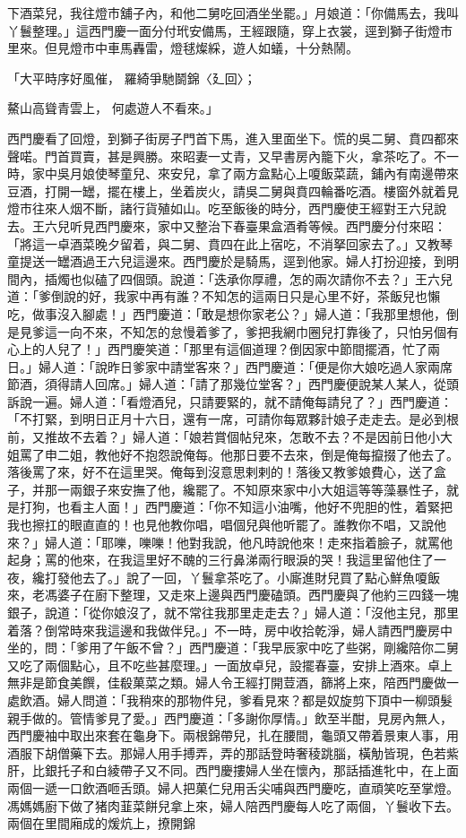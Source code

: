 \begin{showcontents}{}
下酒菜兒，我往燈巿舖子內，和他二舅吃回酒坐坐罷。」月娘道：「你備馬去，我叫丫鬟整理。」這西門慶一面分付玳安備馬，王經跟隨，穿上衣裳，逕到獅子街燈巿里來。但見燈巿中車馬轟雷，燈毬燦綵，遊人如蟻，十分熱鬧。

「大平時序好風催，  羅綺爭馳鬬錦〈廴回〉；

鰲山高聳青雲上，  何處遊人不看來。」

西門慶看了回燈，到獅子街房子門首下馬，進入里面坐下。慌的吳二舅、賁四都來聲喏。門首買賣，甚是興勝。來昭妻一丈青，又早書房內籠下火，拿茶吃了。不一時，家中吳月娘使琴童兒、來安兒，拿了兩方盒點心上嗄飯菜蔬，鋪內有南邊帶來豆酒，打開一罎，擺在樓上，坐着炭火，請吳二舅與賁四輪番吃酒。樓窗外就着見燈巿往來人烟不斷，諸行貨殖如山。吃至飯後的時分，西門慶使王經對王六兒說去。王六兒听見西門慶來，家中又整治下春臺果盒酒肴等候。西門慶分付來昭：「將這一卓酒菜晚夕留着，與二舅、賁四在此上宿吃，不消拏回家去了。」又教琴童提送一罎酒過王六兒這邊來。西門慶於是騎馬，逕到他家。婦人打扮迎接，到明間內，插燭也似磕了四個頭。說道：「迭承你厚禮，怎的兩次請你不去？」王六兒道：「爹倒說的好，我家中再有誰？不知怎的這兩日只是心里不好，茶飯兒也懶吃，做事沒入腳處！」西門慶道：「敢是想你家老公？」婦人道：「我那里想他，倒是見爹這一向不來，不知怎的怠慢着爹了，爹把我網巾圈兒打靠後了，只怕另個有心上的人兒了！」西門慶笑道：「那里有這個道理？倒因家中節間擺酒，忙了兩日。」婦人道：「說昨日爹家中請堂客來？」西門慶道：「便是你大娘吃過人家兩席節酒，須得請人回席。」婦人道：「請了那幾位堂客？」西門慶便說某人某人，從頭訴說一遍。婦人道：「看燈酒兒，只請要緊的，就不請俺每請兒了？」西門慶道：「不打緊，到明日正月十六日，還有一席，可請你每眾夥計娘子走走去。是必到根前，又推故不去着？」婦人道：「娘若賞個帖兒來，怎敢不去？不是因前日他小大姐罵了申二姐，教他好不抱怨說俺每。他那日要不去來，倒是俺每攛掇了他去了。落後罵了來，好不在這里哭。俺每到沒意思剌剌的！落後又教爹娘費心，送了盒子，并那一兩銀子來安撫了他，纔罷了。不知原來家中小大姐這等等藻暴性子，就是打狗，也看主人面！」西門慶道：「你不知這小油嘴，他好不兜胆的性，着緊把我也擦扛的眼直直的！也見他教你唱，唱個兒與他听罷了。誰教你不唱，又說他來？」婦人道：「耶嚛，嚛嚛！他對我說，他凡時說他來！走來指着臉子，就罵他起身；罵的他來，在我這里好不醜的三行鼻涕兩行眼淚的哭！我這里留他住了一夜，纔打發他去了。」說了一回，丫鬟拿茶吃了。小廝進財兒買了點心鮮魚嗄飯來，老馮婆子在廚下整理，又走來上邊與西門慶磕頭。西門慶與了他約三四錢一塊銀子，說道：「從你娘沒了，就不常往我那里走走去？」婦人道：「沒他主兒，那里着落？倒常時來我這邊和我做伴兒。」不一時，房中收拾乾淨，婦人請西門慶房中坐的，問：「爹用了午飯不曾？」西門慶道：「我早辰家中吃了些粥，剛纔陪你二舅又吃了兩個點心，且不吃些甚麼理。」一面放卓兒，設擺春臺，安排上酒來。卓上無非是節食美饌，佳殽菓菜之類。婦人令王經打開荳酒，篩將上來，陪西門慶做一處飲酒。婦人問道：「我稍來的那物件兒，爹看見來？都是奴旋剪下頂中一柳頭髮親手做的。管情爹見了愛。」西門慶道：「多謝你厚情。」飲至半酣，見房內無人，西門慶袖中取出來套在龜身下。兩根錦帶兒，扎在腰間，龜頭又帶着景東人事，用酒服下胡僧藥下去。那婦人用手搏弄，弄的那話登時奢稜跳腦，橫觔皆現，色若紫肝，比銀托子和白綾帶子又不同。西門慶摟婦人坐在懷內，那話插進牝中，在上面兩個一遞一口飲酒咂舌頭。婦人把菓仁兒用舌尖哺與西門慶吃，直頑笑吃至掌燈。馮媽媽廚下做了猪肉韮菜餅兒拿上來，婦人陪西門慶每人吃了兩個，丫鬟收下去。兩個在里間廂成的煖炕上，撩開錦
\end{showcontents}
